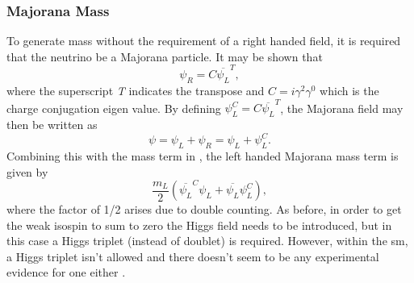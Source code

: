 \subsubsection{Majorana Mass}
To generate mass without the requirement of a right handed field, it is required that the neutrino be a Majorana particle. It may be shown that 
\begin{equation}
    \psi_R = C\overline{\psi_L}^T,
\end{equation}
where the superscript \textit{T} indicates the transpose and $C = i \gamma^2 \gamma^0$ which is the charge conjugation eigen value. By defining $\psi_L^C = C\overline{\psi_L}^T$, the Majorana field may then be written as
\begin{equation}
    \psi = \psi_L + \psi_R = \psi_L + \psi_L^C.
\end{equation}
Combining this with the mass term in , the left handed Majorana mass term is given by 
\begin{equation}\label{eqn:Majorana mass term}
    \frac{m_L}{2}(\overline{\psi_L}^C\psi_L + \overline{\psi_L}\psi_L^C), 
\end{equation}
where the factor of 1/2 arises due to double counting. As before, in order to get the weak isospin to sum to zero the Higgs field needs to be introduced, but in this case a Higgs triplet (instead of doublet) is required. However, within the \gls{sm}, a Higgs triplet isn't allowed and there doesn't seem to be any experimental evidence for one either \cite{Fundamentals_of_Neutrino_Physics_and_Astrophysics}. 


